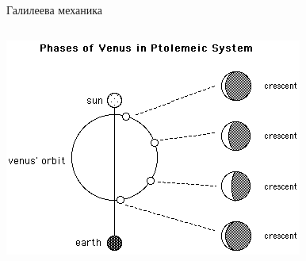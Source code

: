 \documentclass[10pt,a4paper]{beamer}
\begin{document}
        \begin{frame}{ Галилеева механика }
            \begin{columns}
                \begin{column}{0.5\textwidth}
                    \includegraphics[width=\textwidth]{images/galilei_venus_ptolomey.png}
                \end{column}
            \end{columns}
        \end{frame}
        
\end{document}
